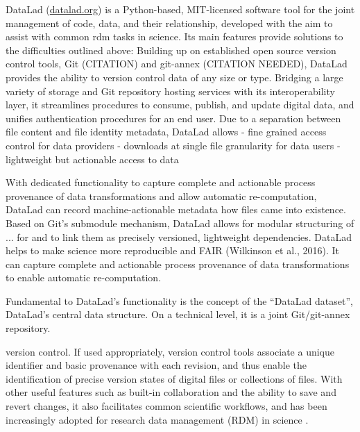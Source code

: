 DataLad (\href{http://datalad.org}{datalad.org}) \citep{Halchenko2021} is a Python-based, MIT-licensed software tool for the joint management of code, data, and their relationship, developed with the aim to assist with common \gls{rdm} tasks in science.
Its main features provide solutions to the difficulties outlined above:
Building up on established open source version control tools, Git (CITATION) and git-annex (CITATION NEEDED), DataLad provides the ability to version control data of any size or type.
Bridging a large variety of storage and Git repository hosting services with its interoperability layer, it streamlines procedures to consume, publish, and update digital data, and unifies authentication procedures for an end user.
Due to a separation between file content and file identity metadata, DataLad allows
- fine grained access control for data providers
- downloads at single file granularity for data users
- lightweight but actionable access to data

With dedicated functionality to capture complete and actionable process provenance of data transformations and allow automatic re-computation, DataLad can record machine-actionable metadata how files came into existence.
Based on Git's submodule mechanism, DataLad allows for modular structuring of ...
 for  and to link them as precisely versioned, lightweight
dependencies. DataLad helps to make science more reproducible and FAIR (Wilkinson et al.,
2016). It can capture complete and actionable process provenance of data transformations to
enable automatic re-computation.

Fundamental to DataLad's functionality is the concept of the ``DataLad dataset'', DataLad's central data structure.
On a technical level, it is a joint Git/git-annex repository.

 version control. If used appropriately, version control tools associate a unique identifier and basic provenance with each revision, and thus enable the identification of precise version states of digital files or collections of files. With other useful features such as built-in collaboration and the ability to save and revert changes, it also facilitates common scientific workflows, and has been increasingly adopted for research data management (RDM) in science \citep{nord2019towards} \citep{strupler2017reproducibility} \citep{bryan2018excuse} \citep{corti2019managing}.



